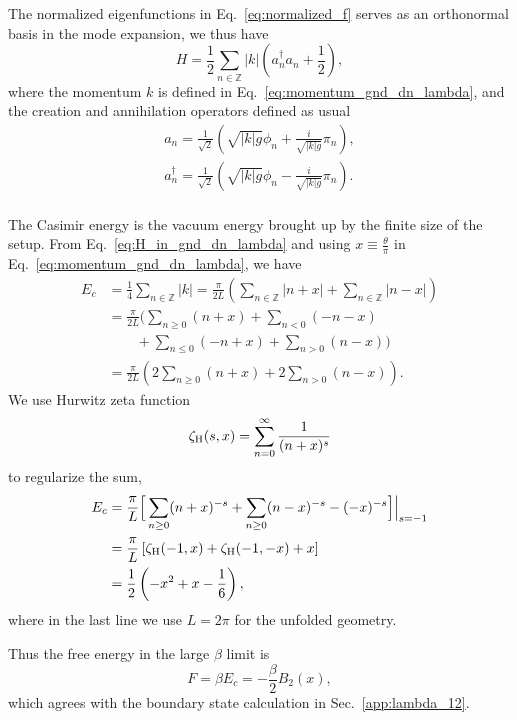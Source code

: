 The normalized eigenfunctions in Eq.~\eqref{eq:normalized_f} serves as an orthonormal basis in the mode expansion, we thus have
\begin{equation}
\label{eq:H_in_gnd_dn_lambda}
H = \frac{1}{2} \sum_{n \in \mathbb{Z} } |k|  \left(a^{\dagger}_n a_n + \frac{1}{2} \right) ,
\end{equation}
where the momentum $k$ is defined in Eq.~\eqref{eq:momentum_gnd_dn_lambda}, and the creation and annihilation operators defined as usual
\begin{equation}
\begin{aligned}
a_n = \frac{1}{\sqrt{2}} \left( \sqrt{ |k|g} \phi_n + \frac{i }{\sqrt{|k|g} }\pi_n  \right) ,\\
a^{\dagger}_n = \frac{1}{\sqrt{2}} \left( \sqrt{ |k|g} \phi_n - \frac{i }{\sqrt{|k|g} }\pi_n  \right) .\\
\end{aligned}
\end{equation}

The Casimir energy is the vacuum energy brought up by the finite size of the setup. From Eq.~\eqref{eq:H_in_gnd_dn_lambda} and using $x\equiv \frac{\theta}{\pi}$ in Eq.~\eqref{eq:momentum_gnd_dn_lambda}, we have
\begin{equation}
\begin{aligned}
E_c &= \frac{1}{4} \sum_{n \in \mathbb{Z}} | k| = \frac{\pi}{2L} \left( \sum_{n \in \mathbb{Z}}  | n + x | + \sum_{n \in \mathbb{Z}}  | n - x |  \right) \\
&= \frac{\pi}{2L} \Bigg( \sum_{n\ge 0 }  ( n + x ) + \sum_{n< 0 }  ( -n - x )  \\
&\quad \quad + \sum_{n \le 0}  (- n + x ) + \sum_{n > 0} ( n- x )  \Bigg) \\
&= \frac{\pi}{2L} \left( 2\sum_{n\ge 0 }  ( n + x ) + 2\sum_{n > 0} ( n- x )  \right).
\end{aligned}
\end{equation}
We use Hurwitz zeta function
\begin{equation}
\zeta_{\rm H}(s,x) = \sum_{n=0}^\infty\frac{1}{(n+x)^s}
\end{equation}
to regularize the sum, 
\begin{equation}
\begin{aligned}
E_c &= \frac{\pi}{L} \Big[\sum_{n \ge 0 } ( n + x )^{-s} + \sum_{n \ge 0 }  ( n - x)^{-s}  -  (-x)^{-s} \Big]\Big|_{s = -1} \\
&= \frac{\pi}{L} \left[ \zeta_{\rm H}( -1, x ) + \zeta_{\rm H}( -1, -x ) +  x \right] \\
&= \frac{1}{2} \left( - x^2 + x - \frac{1}{6}\right),
\end{aligned}
\end{equation}
where in the last line we use $L = 2\pi$ for the unfolded geometry. 

Thus the free energy in the large $\beta$ limit is
\begin{equation}
F = \beta E_c = - \frac{\beta}{2} B_2( x) ,
\end{equation}
which agrees with the boundary state calculation in Sec.~\ref{app:lambda_12}. 

